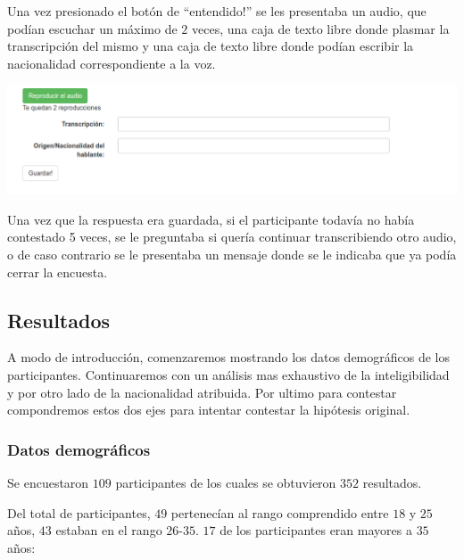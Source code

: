 Una vez presionado el botón de ``entendido!'' se les presentaba un audio, que podían escuchar un máximo de $2$ veces, una caja de texto libre donde plasmar la transcripción del mismo y una caja de texto libre donde podían escribir la nacionalidad correspondiente a la voz.

\begin{center}
\includegraphics[scale=0.4]{estudio_online/estudio3.png}
\end{center}

Una vez que la respuesta era guardada, si el participante todavía no había contestado 5 veces, se le preguntaba si quería continuar transcribiendo otro audio, o de caso contrario se le presentaba un mensaje donde se le indicaba que ya podía cerrar la encuesta.

\pagebreak

\subsection{Resultados}

A modo de introducción, comenzaremos mostrando los datos demográficos de los participantes. Continuaremos con un análisis mas exhaustivo de la inteligibilidad y por otro lado de la nacionalidad atribuida. Por ultimo para contestar compondremos estos dos ejes para intentar contestar la hipótesis original.

\subsubsection{Datos demográficos}

Se encuestaron $109$ participantes de los cuales se obtuvieron $352$ resultados.

Del total de participantes, $49$ pertenecían al rango comprendido entre $18$ y $25$ años, $43$ estaban en el rango $26$-$35$. $17$ de los participantes eran mayores a $35$ años:  

